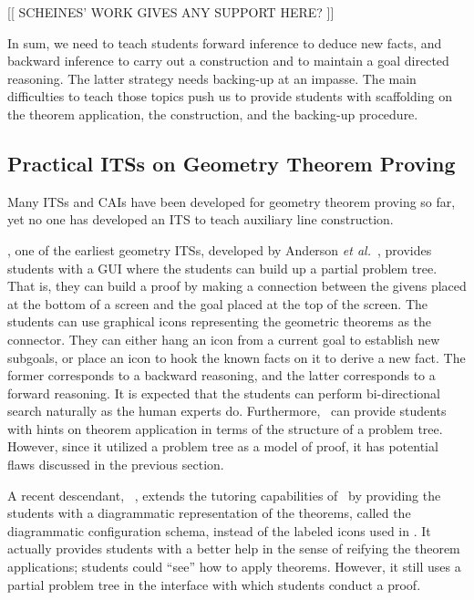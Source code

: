 [[ SCHEINES' WORK GIVES ANY SUPPORT HERE? ]]  \cite{Scheines94}

In sum, we need to teach students forward inference to deduce new facts,
and backward inference to carry out a construction and to maintain a
goal directed reasoning.  The latter strategy needs backing-up at an
impasse.  The main difficulties to teach those topics push us to provide
students with scaffolding on the theorem application, the construction,
and the backing-up procedure.

\subsection{Practical ITSs on Geometry Theorem Proving}

Many ITSs and CAIs have been developed for geometry theorem proving so
far, yet no one has developed an ITS to teach auxiliary line
construction.

\GeometryTutor, one of the earliest geometry ITSs, developed by Anderson
\textit{et al.}~\cite{Anderson85}, provides students with a GUI where
the students can build up a partial problem tree.  That is, they can
build a proof by making a connection between the givens placed at the
bottom of a screen and the goal placed at the top of the screen.  The
students can use graphical icons representing the geometric theorems as
the connector.  They can either hang an icon from a current goal to
establish new subgoals, or place an icon to hook the known facts on it
to derive a new fact.  The former corresponds to a backward reasoning,
and the latter corresponds to a forward reasoning.  It is expected that
the students can perform bi-directional search naturally as the human
experts do.  Furthermore, \GeometryTutor\ can provide students with
hints on theorem application in terms of the structure of a problem
tree.  However, since it utilized a problem tree as a model of proof, it
has potential flaws discussed in the previous section.

A recent descendant, \Angle\ \cite{Koedinger93}, extends the tutoring
capabilities of \GeometryTutor\ by providing the students with a
diagrammatic representation of the theorems, called the diagrammatic
configuration schema, instead of the labeled icons used in
\GeometryTutor.  It actually provides students with a better help in the
sense of reifying the theorem applications; students could ``see'' how
to apply theorems.  However, it still uses a partial problem tree in the
interface with which students conduct a proof.

